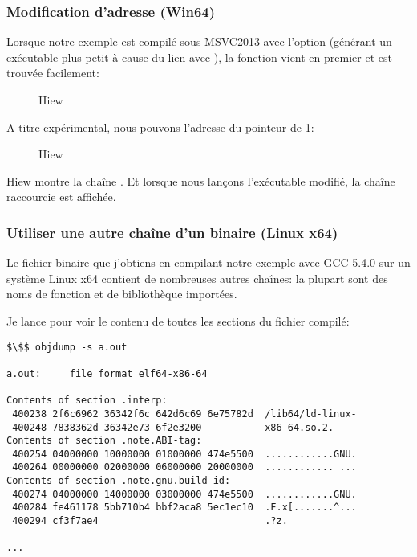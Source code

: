 ﻿\subsubsection{Modification d'adresse (Win64)}

Lorsque notre exemple est compilé sous MSVC2013 avec l'option 
(générant un exécutable plus petit à cause du lien avec ), la fonction \main vient en premier et
est trouvée facilement:

\begin{figure}[H]
\centering
{}
\caption{Hiew}
\label{}
\end{figure}

A titre expérimental, nous pouvons  l'adresse du pointeur de 1:

\begin{figure}[H]
\centering
{}
\caption{Hiew}
\label{}
\end{figure}

Hiew montre la chaîne .
Et lorsque nous lançons l'exécutable modifié, la chaîne raccourcie est affichée.

\subsubsection{Utiliser une autre chaîne d'un binaire (Linux x64)}

Le fichier binaire que j'obtiens en compilant notre exemple avec GCC 5.4.0 sur un système Linux x64 contient de
nombreuses autres chaînes:
la plupart sont des noms de fonction et de bibliothèque importées.

Je lance  pour voir le contenu de toutes les sections du fichier compilé:

\begin{lstlisting}[basicstyle=\ttfamily, mathescape]
$\$$ objdump -s a.out

a.out:     file format elf64-x86-64

Contents of section .interp:
 400238 2f6c6962 36342f6c 642d6c69 6e75782d  /lib64/ld-linux-
 400248 7838362d 36342e73 6f2e3200           x86-64.so.2.
Contents of section .note.ABI-tag:
 400254 04000000 10000000 01000000 474e5500  ............GNU.
 400264 00000000 02000000 06000000 20000000  ............ ...
Contents of section .note.gnu.build-id:
 400274 04000000 14000000 03000000 474e5500  ............GNU.
 400284 fe461178 5bb710b4 bbf2aca8 5ec1ec10  .F.x[.......^...
 400294 cf3f7ae4                             .?z.

...
\end{lstlisting}

